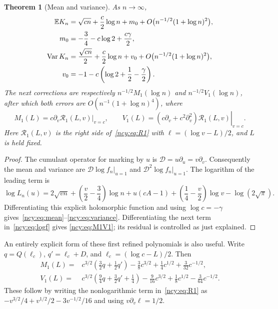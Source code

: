 \documentclass[11pt,letterpaper]{article}
\numberwithin{equation}{section}
\newtheorem{theorem}{Theorem}[section]
\theoremstyle{remark}\newtheorem{remark}[theorem]{Remark}
\newcommand{\EE}{\mathbb E}
\newcommand{\Var}{\operatorname{Var}}
\theoremstyle{definition}\newtheorem{definition}[theorem]{Definition}\theoremstyle{plain}
\begin{document}
\begin{theorem}[Mean and variance]\label{ncy:thm:moments}
As $n\to\infty$,
\begin{align}\label{ncy:eq:mean}
 \EE K_n&=\sqrt{cn}+\frac c2\log n+m_0
             +O\bigl(n^{-1/2}(1+\log n)^2\bigr),\\
 m_0&=-\frac34-c\log2+\frac{c\gamma}{2},\notag\\
 \Var K_n&=\frac{\sqrt{cn}}2+\frac c2\log n+v_0
             +O\bigl(n^{-1/2}(1+\log n)^2\bigr),\label{ncy:eq:variance}\\
 v_0&=-1-c\left(\log2+\frac12-\frac\gamma2\right).\notag
\end{align}
The next corrections are respectively $n^{-1/2}M_1(\log n)$ and
$n^{-1/2}V_1(\log n)$, after which both errors are
$O(n^{-1}(1+\log n)^4)$, where
\begin{equation}\label{ncy:eq:M1V1}
 M_1(L)=\left.c\partial_v\mathcal R_1(L,v)\right|_{v=c},\qquad
 V_1(L)=\left.(c\partial_v+c^2\partial_v^2)
                      \mathcal R_1(L,v)\right|_{v=c}.
\end{equation}
Here $\mathcal R_1(L,v)$ is the right side of~\eqref{ncy:eq:R1} with
$\ell=(\log v-L)/2$, and $L$ is held fixed.
\end{theorem}
\begin{proof}
The cumulant operator for marking by $u$ is
$\mathcal D=u\partial_u=v\partial_v$. Consequently the mean and
variance are $\mathcal D\log f_n|_{u=1}$ and
$\mathcal D^2\log f_n|_{u=1}$. The logarithm of the leading term is
\begin{equation}\label{ncy:eq:logleading}
 \log L_n(u)=2\sqrt{vn}+\left(\frac v2-\frac34\right)\log n
       +u(cA-1)+\left(\frac14-\frac v2\right)\log v
       -\log(2\sqrt\pi).
\end{equation}
Differentiating this explicit holomorphic function and using
$\log c=-\gamma$ gives~\eqref{ncy:eq:mean}--\eqref{ncy:eq:variance}.
Differentiating the next term in~\eqref{ncy:eq:logf} gives
\eqref{ncy:eq:M1V1}; its residual is controlled as just explained.
\end{proof}

An entirely explicit form of these first refined polynomials is also
useful. Write $q=Q(\ell_c)$, $q'=\ell_c+D$, and
$\ell_c=(\log c-L)/2$. Then
\begin{align}\label{ncy:eq:explicitM1}
 M_1(L)={}&c^{3/2}\left(\frac32q+\frac12q'\right)
       -\frac38c^{3/2}+\frac14c^{1/2}+\frac3{32}c^{-1/2},\\
 V_1(L)={}&c^{3/2}\left(\frac94q+\frac32q'+\frac14\right)
       -\frac9{16}c^{3/2}+\frac18c^{1/2}-\frac3{64}c^{-1/2}.
       \label{ncy:eq:explicitV1}
\end{align}
These follow by writing the nonlogarithmic term in~\eqref{ncy:eq:R1}
as $-v^{3/2}/4+v^{1/2}/2-3v^{-1/2}/16$ and using
$v\partial_v\ell=1/2$.
\end{document}
